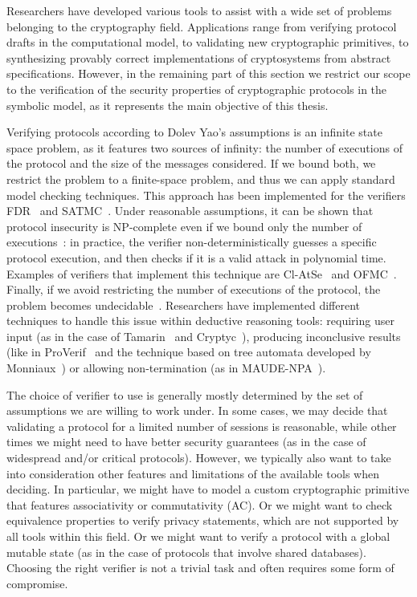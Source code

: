 Researchers have developed various tools to assist with a wide set of problems belonging to the cryptography field. Applications range from verifying protocol drafts in the computational model, to validating new cryptographic primitives, to synthesizing provably correct implementations of cryptosystems from abstract specifications. However, in the remaining part of this section we restrict our scope to the verification of the security properties of cryptographic protocols in the symbolic model, as it represents the main objective of this thesis.

Verifying protocols according to Dolev Yao's assumptions is an infinite state space problem, as it features two sources of infinity: the number of executions of the protocol and the size of the messages considered. If we bound both, we restrict the problem to a finite-space problem, and thus we can apply standard model checking techniques. This approach has been implemented for the verifiers FDR~\cite{fdr} and SATMC~\cite{satmc}. Under reasonable assumptions, it can be shown that protocol insecurity is NP-complete even if we bound only the number of executions~\cite{boundedsessionsnp}: in practice, the verifier non-deterministically guesses a specific protocol execution, and then checks if it is a valid attack in polynomial time. Examples of verifiers that implement this technique are Cl-AtSe~\cite{clatse} and OFMC~\cite{ofmc}. Finally, if we avoid restricting the number of executions of the protocol, the problem becomes undecidable~\cite{complexitybounded}. Researchers have implemented different techniques to handle this issue within deductive reasoning tools: requiring user input (as in the case of Tamarin~\cite{TamarinFoundations} and Cryptyc~\cite{cryptyc}), producing inconclusive results (like in ProVerif~\cite{proverif} and the technique based on tree automata developed by Monniaux~\cite{monniaux}) or allowing non-termination (as in MAUDE-NPA~\cite{nrl, maude}).

The choice of verifier to use is generally mostly determined by the set of assumptions we are willing to work under. In some cases, we may decide that validating a protocol for a limited number of sessions is reasonable, while other times we might need to have better security guarantees (as in the case of widespread and/or critical protocols). However, we typically also want to take into consideration other features and limitations of the available tools when deciding. In particular, we might have to model a custom cryptographic primitive that features associativity or commutativity (AC). Or we might want to check equivalence properties to verify privacy statements, which are not supported by all tools within this field. Or we might want to verify a protocol with a global mutable state (as in the case of protocols that involve shared databases). Choosing the right verifier is not a trivial task and often requires some form of compromise. 

